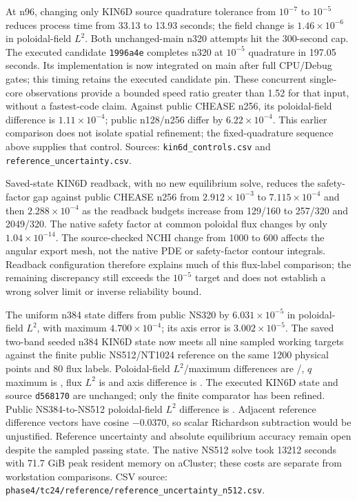 \documentclass[10pt,a4paper]{article}
\newcommand{\dataref}[1]{{\footnotesize CSV source: \texttt{#1}}}
\begin{document}
At n96, changing only KIN6D source quadrature tolerance from $10^{-7}$ to
$10^{-5}$ reduces process time from 33.13 to 13.93 seconds; the field change
is $1.46\times10^{-6}$ in poloidal-field $L^2$. Both unchanged-main n320
attempts hit the 300-second cap. The executed candidate \texttt{1996a4e}
completes n320 at $10^{-5}$ quadrature in 197.05 seconds. Its implementation
is now integrated on main after full CPU/Debug gates; this timing retains the
executed candidate pin. These concurrent single-core observations provide a bounded
speed ratio greater than 1.52 for that input, without a fastest-code claim.
Against public CHEASE n256, its poloidal-field difference is
$1.11\times10^{-4}$; public n128/n256 differ by $6.22\times10^{-4}$.
This earlier comparison does not isolate spatial refinement; the fixed-quadrature
sequence above supplies that control. Sources: \texttt{kin6d\_controls.csv} and
\texttt{reference\_uncertainty.csv}.

Saved-state KIN6D readback, with no new equilibrium solve, reduces the
safety-factor gap against public CHEASE n256 from $2.912\times10^{-3}$ to
$7.115\times10^{-4}$ and then $2.288\times10^{-4}$ as the readback budgets
increase from 129/160 to 257/320 and 2049/320. The native safety factor at
common poloidal flux changes by only $1.04\times10^{-14}$.
The source-checked NCHI change from 1000 to 600 affects the angular
export mesh, not the native PDE or safety-factor contour integrals.
Readback configuration therefore explains much of this flux-label comparison;
the remaining discrepancy still exceeds the $10^{-5}$ target and does not
establish a wrong solver limit or inverse reliability bound.

The uniform n384 state differs from public NS320 by
$6.031\times10^{-5}$ in poloidal-field $L^2$, with maximum
$4.700\times10^{-4}$; its axis error is $3.002\times10^{-5}$.
The saved two-band seeded n384 KIN6D state now meets all nine sampled
working targets against the finite public NS512/NT1024 reference on the same
1200 physical points and 80 flux labels. Poloidal-field $L^2$/maximum
differences are \TcSeedB{}/\TcSeedBMax{}, $q$ maximum is \TcSeedQ{},
flux $L^2$ is \TcSeedPsi{} and axis difference is \TcSeedAxis{}.
The executed KIN6D state and source \texttt{d568170} are unchanged;
only the finite comparator has been refined.
Public NS384-to-NS512 poloidal-field $L^2$ difference is \TcReferenceBStep{}.
Adjacent reference difference vectors have cosine $-0.0370$, so scalar
Richardson subtraction would be unjustified. Reference uncertainty and
absolute equilibrium accuracy remain open despite the sampled passing state.
The native NS512 solve took 13212 seconds with 71.7 GiB peak resident memory
on aCluster; these costs are separate from workstation comparisons.
\dataref{phase4/tc24/reference/reference\_uncertainty\_n512.csv}.
\end{document}

